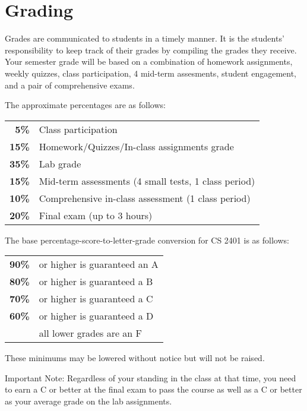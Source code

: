 \documentclass[12pt]{scrartcl}
\begin{document}
\section{Grading}

Grades are communicated to students in a timely manner. 
It is the students’ responsibility to keep track of their grades by compiling the grades they receive. 
Your semester grade will be based on a combination of homework assignments, weekly quizzes, class participation, 4 mid-term assesments, student engagement, and a pair of  comprehensive exams. 

The approximate percentages are as follows:
\begin{center}
\begin{tabular}{rl}
\textbf{5\% } & Class participation \\
\textbf{15\% } & Homework/Quizzes/In-class assignments grade\\
\textbf{35\% } & Lab grade\\
\textbf{15\% } & Mid-term assessments (4 small tests, 1 class period) \\
\textbf{10\% } & Comprehensive in-class assessment (1 class period)\\
\textbf{20\% } & Final exam (up to 3 hours)\\
\end{tabular}
\end{center}
The base percentage-score-to-letter-grade conversion for CS 2401 is as follows: 

\begin{center}
\begin{tabular}{rl}
\textbf{90\%}& or higher is guaranteed an A \\
\textbf{80\%}& or higher is guaranteed a B \\
\textbf{70\%}& or higher is guaranteed a C \\
\textbf{60\%}& or higher is guaranteed a D \\
\textbf{}& all lower grades are an F 
\end{tabular}
\end{center}
These minimums may be lowered without notice but will not be raised. 

{\color{red} Important Note:} 
Regardless of your standing in the class at that time, you need to earn a C or better at the final exam to pass the course as well as a C or better as your average grade on the lab assignments. 
\end{document}
